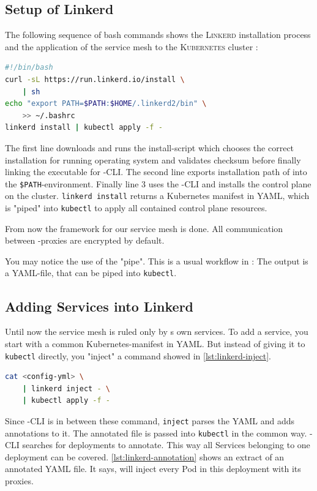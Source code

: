 \subsection{Setup of Linkerd}

The following sequence of bash commands shows the \textsc{Linkerd} installation process and the application of the service mesh to the \textsc{Kubernetes} cluster \cite{linkerd-get-started}:
\begin{lstlisting}[language=bash,caption={Setup of \textsc{Linkerd}}, label={lst:linkerd-setup}]
#!/bin/bash
curl -sL https://run.linkerd.io/install \
	| sh
echo "export PATH=$PATH:$HOME/.linkerd2/bin" \
	>> ~/.bashrc
linkerd install | kubectl apply -f -
\end{lstlisting}
The first line downloads and runs the install-script which chooses the correct installation for running operating system and validates checksum before finally linking the executable for \linkerd{}-CLI.
The second line exports installation path of \linkerd{} into the \lstinline|$PATH|-environment. 
Finally line 3 uses the \linkerd{}-CLI and installs the control plane on the cluster.
\lstinline|linkerd install| returns a Kubernetes manifest in YAML, which is "piped" into \lstinline|kubectl| to apply all contained control plane resources.

From now the framework for our service mesh is done.
All communication between \linkerd{}-proxies are encrypted by default.

You may notice the use of the "pipe". 
This is a usual workflow in \linkerd{}: The output is a YAML-file, that can be piped into \lstinline|kubectl|.

\subsection{Adding Services into Linkerd}
Until now the service mesh is ruled only by \linkerd{}s own services.
To add a service, you start with a common Kubernetes-manifest in YAML.
But instead of giving it to \lstinline|kubectl| directly, you "inject" a \linkerd{} command showed in \autoref{lst:linkerd-inject}.
\begin{lstlisting}[language=bash,caption={Inject \textsc{Linkerd}-annotation into manifest.}, label={lst:linkerd-inject}]
cat <config-yml> \
	| linkerd inject - \
	| kubectl apply -f -
\end{lstlisting}
Since \linkerd{}-CLI is in between these command, \lstinline|inject| parses the YAML and adds annotations to it.
The annotated file is passed into \lstinline|kubectl| in the common way.
\linkerd{}-CLI searches for deployments to annotate.
This way all Services belonging to one deployment can be covered.
\autoref{lst:linkerd-annotation} shows an extract of an annotated YAML file.
It says, \linkerd{} will inject every Pod in this deployment with its proxies.

